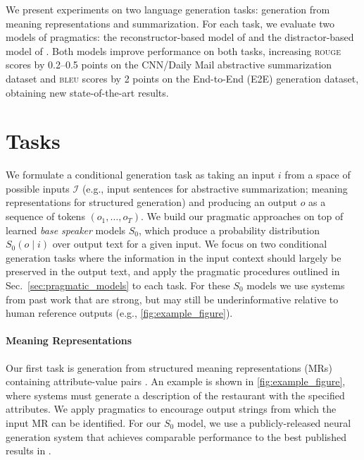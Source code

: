 \documentclass[11pt,a4paper]{article}
\newcommand{\basespk}[0]{$S_0$\xspace}
\newcommand{\bleu}{\textsc{bleu}\xspace}
\newcommand{\rouge}{\textsc{rouge}\xspace}
\newcommand{\eg}{e.g., }
\begin{document}
We present experiments on two language generation tasks: 
generation from meaning representations \cite{novikova2017e2e} and summarization.
For each task, we evaluate two models of pragmatics:
the reconstructor-based model of \citet{fried2017unified} and the distractor-based 
model of \citet{cohn2018pragmatically}. Both models improve performance on both tasks, increasing \rouge scores by 0.2--0.5 points on the CNN/Daily Mail  
abstractive summarization dataset and \bleu scores by 2 points on the 
End-to-End (E2E) generation dataset, obtaining new state-of-the-art results.
 \section{Tasks}
\label{sec:tasks}

We formulate a conditional generation task as taking an input $i$ from a space of possible inputs $\mathcal{I}$
(\eg input sentences for abstractive summarization; meaning representations for structured generation) and producing an output $o$ as a sequence of tokens $(o_1, \ldots, o_T)$. 
We build our pragmatic approaches on top of learned \emph{base speaker} models \basespk, which produce a probability distribution $S_0(o \mid i)$ 
over output text for a given input.
We focus on two conditional generation tasks where the information in the input context should largely be preserved in the output text, and apply the pragmatic procedures outlined in Sec.\ \ref{sec:pragmatic_models} to each task. 
For these \basespk models we use systems from past work that are strong, but may still be underinformative relative to human reference outputs (\eg \autoref{fig:example_figure}).





\paragraph{Meaning Representations}
Our first task is generation from structured meaning representations (MRs) containing attribute-value pairs \cite{novikova2017e2e}. An example is shown in \autoref{fig:example_figure}, where systems must generate a description of the restaurant with the specified attributes. We apply pragmatics to encourage output strings from which the input MR can be identified. For our \basespk model, we use a publicly-released neural generation system \citep{puzikov2018e2e} that achieves comparable performance to the best published results in \citet{duvsek2018findings}. 
\end{document}
